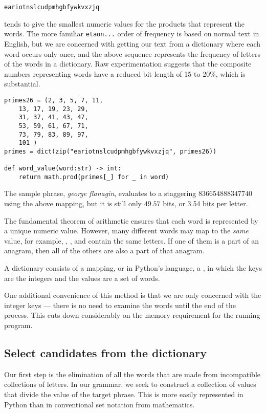 \documentclass[letterpaper, 11pt]{article}
\begin{document}
\verb|eariotnslcudpmhgbfywkvxzjq|

tends to give the smallest numeric values for the products that represent
the words. The more familiar \verb|etaon...| order of frequency is based
on normal text in English, but we are concerned with getting our
text from a dictionary where each word occurs only once, and the above
sequence represents the frequency of letters of the words in a dictionary.
Raw experimentation suggests that the composite numbers representing
words have a reduced bit length of 15 to 20\%, which is substantial.

\begin{verbatim}
primes26 = (2, 3, 5, 7, 11,
    13, 17, 19, 23, 29,
    31, 37, 41, 43, 47,
    53, 59, 61, 67, 71,
    73, 79, 83, 89, 97,
    101 )
primes = dict(zip("eariotnslcudpmhgbfywkvxzjq", primes26))

def word_value(word:str) -> int:
    return math.prod(primes[_] for _ in word)
\end{verbatim}


The sample phrase, \emph{george flanagin}, evaluates to a staggering
$836654888347740$ using the above mapping, but it is still only 
$49.57$ bits, or 3.54 bits per letter.

The fundamental theorem of arithmetic ensures that each
word is represented by a unique numeric value. However, many different
words may map to the \emph{same} value, for example, , ,
and  contain the same letters. If one of them is a part of
an anagram, then all of the others are also a part of that anagram.

A dictionary consists of a mapping, or in Python's language, a , in
which the keys are the integers and the values are a set of words.

One additional convenience of this method is that we are only concerned
with the integer keys --- there is no need to examine the words until
the end of the process. This cuts down considerably on the memory
requirement for the running program.


\subsection{Select candidates from the dictionary}

Our first step is the elimination of all the words that are made
from incompatible collections of letters. In our grammar, we seek
to construct a collection of values that divide the value of the 
target phrase. This is more easily represented in Python than in 
conventional set notation from mathematics. 
\end{document}
